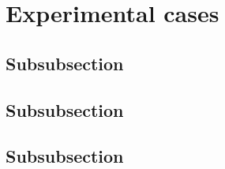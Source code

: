 \section{Experimental cases}
\label{sec52}


\lipsum[1]

\subsection{Subsubsection}
\label{sec521}

\lipsum[1]

\subsection{Subsubsection}
\label{sec522}

\lipsum[1]

\subsection{Subsubsection}
\label{sec523}

\lipsum[1]
